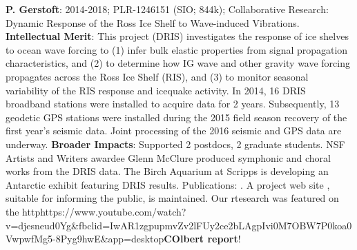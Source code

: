 {\bf  P. Gerstoft}: 2014-2018; PLR-1246151 (SIO; 844k); Collaborative Research: Dynamic Response of the Ross Ice Shelf to Wave-induced Vibrations. {\bf Intellectual Merit}: This project (DRIS) investigates the response of ice shelves to ocean wave forcing to (1) infer bulk elastic properties from signal propagation characteristics, and (2) to determine how IG wave and other gravity wave forcing propagates across the Ross Ice Shelf (RIS), and (3) to monitor seasonal variability of the RIS response and icequake activity. In 2014, 16 DRIS broadband stations were installed to acquire data for 2 years. Subsequently, 13 geodetic GPS stations were installed during the 2015 field season recovery of the first year’s seismic data. Joint processing of the 2016 seismic and GPS data are underway. {\bf Broader Impacts}: Supported 2 postdocs, 2 graduate students. NSF Artists and Writers awardee Glenn McClure produced symphonic and choral works from the DRIS data. The Birch Aquarium at Scripps is developing an Antarctic exhibit featuring DRIS results. Publications: \cite{bromirski2015,diez2016,bromirski2017,chen2018,shen2018,chaput2018,white2019}. A project web site , suitable for informing the public, is maintained. 
Our rtesearch was featured on the http{https://www.youtube.com/watch?v=djesneud0Yg&fbclid=IwAR1zgpupmvZv2lFUy2ce2bLAgpIvi0M7OBW7P0koa0VwpwfMg5-8Pyg9hwE&app=desktop}{\bf COlbert report}!


